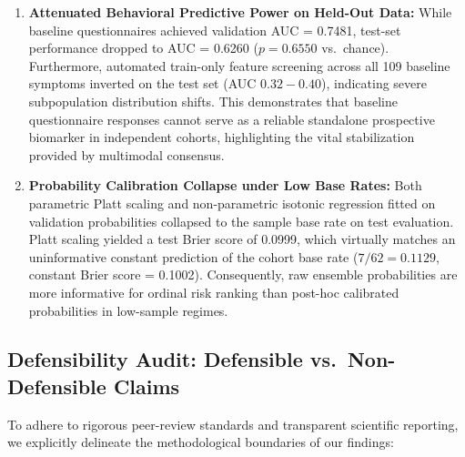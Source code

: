 \documentclass[10pt,letterpaper]{article}
\begin{document}
\begin{enumerate}
    \item \textbf{Attenuated Behavioral Predictive Power on Held-Out Data:} While baseline questionnaires achieved validation AUC = 0.7481, test-set performance dropped to AUC = 0.6260 ($p = 0.6550$ vs.\ chance). Furthermore, automated train-only feature screening across all 109 baseline symptoms inverted on the test set (AUC $0.32-0.40$), indicating severe subpopulation distribution shifts. This demonstrates that baseline questionnaire responses cannot serve as a reliable standalone prospective biomarker in independent cohorts, highlighting the vital stabilization provided by multimodal consensus.
    \item \textbf{Probability Calibration Collapse under Low Base Rates:} Both parametric Platt scaling and non-parametric isotonic regression fitted on validation probabilities collapsed to the sample base rate on test evaluation. Platt scaling yielded a test Brier score of 0.0999, which virtually matches an uninformative constant prediction of the cohort base rate ($7/62 = 0.1129$, constant Brier score = 0.1002). Consequently, raw ensemble probabilities are more informative for ordinal risk ranking than post-hoc calibrated probabilities in low-sample regimes.
\end{enumerate}

\subsection*{Defensibility Audit: Defensible vs.\ Non-Defensible Claims}

To adhere to rigorous peer-review standards and transparent scientific reporting, we explicitly delineate the methodological boundaries of our findings:
\end{document}
